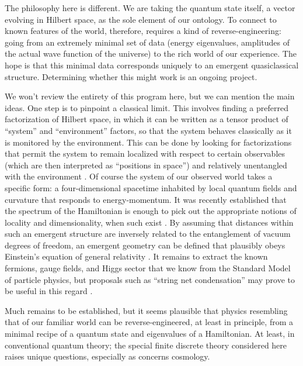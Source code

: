 \documentclass[aps,prd,nofootinbib,notitlepage,12pt]{revtex4-2}
\begin{document}
The philosophy here is different. 
We are taking the quantum state itself, a vector evolving in Hilbert space, as the sole element of our ontology. 
To connect to known features of the world, therefore, requires a kind of reverse-engineering: going from an extremely minimal set of data (energy eigenvalues, amplitudes of the actual wave function of the universe) to the rich world of our experience.
The hope is that this minimal data corresponds uniquely to an emergent quasiclassical structure.
Determining whether this might work is an ongoing project.

We won't review the entirety of this program here, but we can mention the main ideas.
One step is to pinpoint a classical limit.
This involves finding a preferred factorization of Hilbert space, in which it can be written as a tensor product of ``system'' and ``environment'' factors, so that the system behaves classically as it is monitored by the environment.
This can be done by looking for factorizations that permit the system to remain localized with respect to certain observables (which are then interpreted as ``positions in space'') and relatively unentangled with the environment \cite{Carroll:2020gme}.
Of course the system of our observed world takes a specific form: a four-dimensional spacetime inhabited by local quantum fields and curvature that responds to energy-momentum.
It was recently established that the spectrum of the Hamiltonian is enough to pick out the appropriate notions of locality and dimensionality, when such exist \cite{Cotler:2017abq}.
By assuming that distances within such an emergent structure are inversely related to the entanglement of vacuum degrees of freedom, an emergent geometry can be defined that plausibly obeys Einstein's equation of general relativity \cite{Cao:2016mst,Cao:2017hrv}.
It remains to extract the known fermions, gauge fields, and Higgs sector that we know from the Standard Model of particle physics, but proposals such as ``string net condensation'' may prove to be useful in this regard \cite{Levin:2004mi}.

Much remains to be established, but it seems plausible that physics resembling that of our familiar world can be reverse-engineered, at least in principle, from a minimal recipe of a quantum state and eigenvalues of a Hamiltonian.
At least, in conventional quantum theory; the special finite discrete theory considered here raises unique questions, especially as concerns cosmology.
\end{document}
